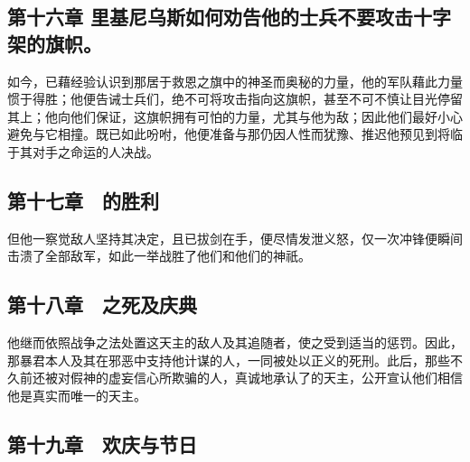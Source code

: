 
\subsection{第十六章 里基尼乌斯如何劝告他的士兵不要攻击十字架的旗帜。}

如今，已藉经验认识到那居于救恩之旗中的神圣而奥秘的力量，他的军队藉此力量惯于得胜；他便告诫士兵们，绝不可将攻击指向这旗帜，甚至不可不慎让目光停留其上；他向他们保证，这旗帜拥有可怕的力量，尤其与他为敌；因此他们最好小心避免与它相撞。既已如此吩咐，他便准备与那仍因人性而犹豫、推迟他预见到将临于其对手之命运的人决战。\par


\subsection{第十七章　的胜利}

但他一察觉敌人坚持其决定，且已拔剑在手，便尽情发泄义怒，仅一次冲锋便瞬间击溃了全部敌军，如此一举战胜了他们和他们的神祇。\par


\subsection{第十八章　之死及庆典}

他继而依照战争之法处置这天主的敌人及其追随者，使之受到适当的惩罚。因此，那暴君本人及其在邪恶中支持他计谋的人，一同被处以正义的死刑。此后，那些不久前还被对假神的虚妄信心所欺骗的人，真诚地承认了的天主，公开宣认他们相信他是真实而唯一的天主。\par


\subsection{第十九章　欢庆与节日}

